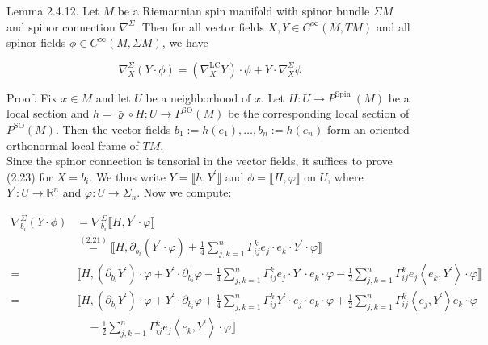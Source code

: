 \documentclass[10pt, letterpaper]{article}
\begin{document}
Lemma 2.4.12. Let $M$ be a Riemannian spin manifold with spinor bundle $\Sigma M$ and spinor connection $\nabla^{\Sigma}$. Then for all vector fields $X, Y \in C^{\infty}(M, T M)$ and all spinor fields $\phi \in C^{\infty}(M, \Sigma M)$, we have

$$
\nabla_{X}^{\Sigma}(Y \cdot \phi)=\left(\nabla_{X}^{\mathrm{LC}} Y\right) \cdot \phi+Y \cdot \nabla_{X}^{\Sigma} \phi
$$

Proof. Fix $x \in M$ and let $U$ be a neighborhood of $x$. Let $H: U \rightarrow P^{\text {Spin }}(M)$ be a local section and $h=\bar{\varrho} \circ H: U \rightarrow P^{\mathrm{SO}}(M)$ be the corresponding local section of $P^{\mathrm{SO}}(M)$. Then the vector fields $b_{1}:=h\left(e_{1}\right), \ldots, b_{n}:=h\left(e_{n}\right)$ form an oriented orthonormal local frame of $T M$.\\
Since the spinor connection is tensorial in the vector fields, it suffices to prove (2.23) for $X=b_{i}$. We thus write $Y=\llbracket h, Y^{\prime} \rrbracket$ and $\phi=\llbracket H, \varphi \rrbracket$ on $U$, where $Y^{\prime}: U \rightarrow \mathbb{R}^{n}$ and $\varphi: U \rightarrow \Sigma_{n}$. Now we compute:

$$
\begin{aligned}
\nabla_{b_{i}}^{\Sigma}(Y \cdot \phi) & =\nabla_{b_{i}}^{\Sigma} \llbracket H, Y^{\prime} \cdot \varphi \rrbracket \\
& \stackrel{(2.21)}{=} \llbracket H, \partial_{b_{i}}\left(Y^{\prime} \cdot \varphi\right)+\frac{1}{4} \sum_{j, k=1}^{n} \Gamma_{i j}^{k} e_{j} \cdot e_{k} \cdot Y^{\prime} \cdot \varphi \rrbracket \\
= & \llbracket H,\left(\partial_{b_{i}} Y^{\prime}\right) \cdot \varphi+Y^{\prime} \cdot \partial_{b_{i}} \varphi-\frac{1}{4} \sum_{j, k=1}^{n} \Gamma_{i j}^{k} e_{j} \cdot Y^{\prime} \cdot e_{k} \cdot \varphi-\frac{1}{2} \sum_{j, k=1}^{n} \Gamma_{i j}^{k} e_{j}\left\langle e_{k}, Y^{\prime}\right\rangle \cdot \varphi \rrbracket \\
= & \llbracket H,\left(\partial_{b_{i}} Y^{\prime}\right) \cdot \varphi+Y^{\prime} \cdot \partial_{b_{i}} \varphi+\frac{1}{4} \sum_{j, k=1}^{n} \Gamma_{i j}^{k} Y^{\prime} \cdot e_{j} \cdot e_{k} \cdot \varphi+\frac{1}{2} \sum_{j, k=1}^{n} \Gamma_{i j}^{k}\left\langle e_{j}, Y^{\prime}\right\rangle e_{k} \cdot \varphi \\
& \quad-\frac{1}{2} \sum_{j, k=1}^{n} \Gamma_{i j}^{k} e_{j}\left\langle e_{k}, Y^{\prime}\right\rangle \cdot \varphi \rrbracket
\end{aligned}
$$
\end{document}
